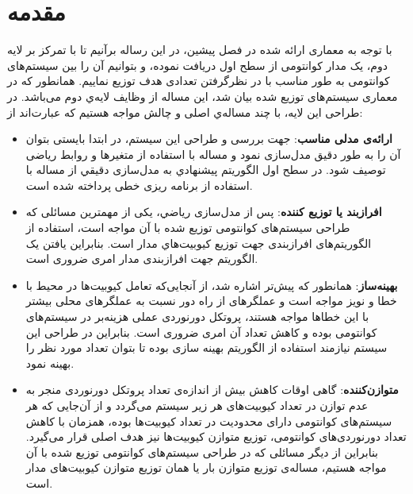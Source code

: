 \section{مقدمه}
\label{مقدمه}
با توجه به معماری ارائه شده در فصل پیشین، در این رساله برآنیم تا با تمرکز بر لایه دوم، یک مدار کوانتومی از سطح اول دریافت نموده، و بتوانیم آن را بین سیستم‌های کوانتومی به طور مناسب با در نظرگرفتن تعدادی هدف توزیع نماییم. همانطور که در معماری سیستم‌های توزیع شده بیان شد، این مساله از وظایف لایه‌ي دوم می‌باشد. در طراحی این لایه، با چند مساله‌ي اصلی و چالش مواجه هستیم که عبارت‌اند از:
\begin{itemize}
\item
\textbf{ارائه‌ی مدلی مناسب}:
جهت بررسی و طراحی این سیستم، در ابتدا بایستی بتوان آن را به طور دقیق مدل‌سازی نمود و مساله با استفاده از متغیرها و روابط ریاضی توصیف شود. در سطح اول الگوريتم پيشنهادي به مدل‌سازی دقیقي از مساله با استفاده از برنامه ریزی خطی پرداخته شده است.
\item
\textbf{ افرازبند یا توزیع کننده}:
پس از مدل‌سازی رياضي، یکی از مهمترین مسائلی که طراحی سیستم‌های کوانتومی توزیع شده با آن مواجه است، استفاده از الگوریتم‌های افرازبندی جهت توزيع كيوبيت‌هاي مدار است. بنابراین یافتن یک الگوریتم جهت افرازبندی مدار امری ضروری است. 
\item
\textbf{بهینه‌ساز}:
همانطور که پیش‌تر اشاره شد، از آنجایی‌که تعامل کیوبیت‌ها در محیط با خطا و نویز مواجه است و عملگرهای از راه دور نسبت به عملگرهای محلی بیشتر با این خطاها مواجه هستند، پروتکل دورنوردی عملی هزینه‌بر در سیستم‌های کوانتومی بوده و کاهش تعداد آن امری ضروری است. بنابراین در طراحی این سیستم نیازمند استفاده از الگوریتم بهینه سازی بوده تا بتوان تعداد مورد نظر را بهینه نمود.%
\item
\textbf{متوازن‌کننده}:
گاهی اوقات کاهش بیش از اندازه‌ی تعداد پروتکل دورنوردی منجر به عدم توازن در تعداد کیوبیت‌های هر زیر سیستم می‌گردد و از آن‌جایی که هر سیستم‌های کوانتومی دارای محدودیت در تعداد کیوبیت‌ها بوده، همزمان با کاهش تعداد دورنوردی‌های کوانتومی، توزیع متوازن کیوبیت‌ها نیز هدف اصلی قرار می‌گیرد. بنابراین از دیگر مسائلی که در طراحی سیستم‌های کوانتومی توزیع شده با آن مواجه هستیم، مساله‌ی توزیع متوازن بار یا همان توزیع متوازن کیوبیت‌های مدار است. 
\end{itemize}

